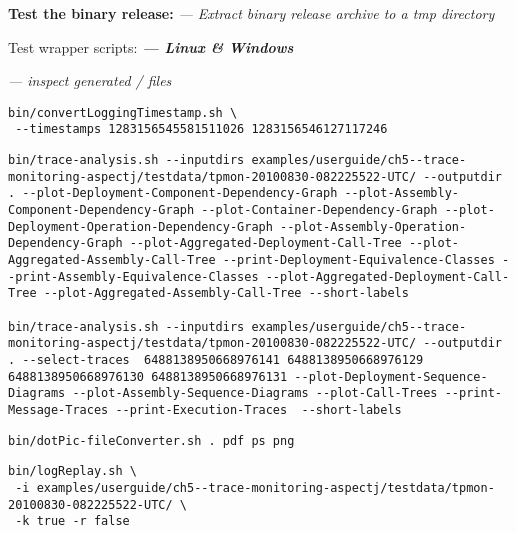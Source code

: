 \begin{compactenum}
\item \textbf{Test the binary release:} \textit{--- Extract binary release archive to a tmp directory}
\begin{compactenum}
\item Test wrapper scripts: \textbf{\textit{--- Linux \& Windows}}
\begin{compactitem}
\item {} \textit{--- inspect generated / files}
\setBashListing
\begin{lstlisting}
bin/convertLoggingTimestamp.sh \
 --timestamps 1283156545581511026 1283156546127117246
\end{lstlisting}
\item {}
\setBashListing
\begin{lstlisting}
bin/trace-analysis.sh --inputdirs examples/userguide/ch5--trace-monitoring-aspectj/testdata/tpmon-20100830-082225522-UTC/ --outputdir . --plot-Deployment-Component-Dependency-Graph --plot-Assembly-Component-Dependency-Graph --plot-Container-Dependency-Graph --plot-Deployment-Operation-Dependency-Graph --plot-Assembly-Operation-Dependency-Graph --plot-Aggregated-Deployment-Call-Tree --plot-Aggregated-Assembly-Call-Tree --print-Deployment-Equivalence-Classes --print-Assembly-Equivalence-Classes --plot-Aggregated-Deployment-Call-Tree --plot-Aggregated-Assembly-Call-Tree --short-labels

bin/trace-analysis.sh --inputdirs examples/userguide/ch5--trace-monitoring-aspectj/testdata/tpmon-20100830-082225522-UTC/ --outputdir . --select-traces  6488138950668976141 6488138950668976129 6488138950668976130 6488138950668976131 --plot-Deployment-Sequence-Diagrams --plot-Assembly-Sequence-Diagrams --plot-Call-Trees --print-Message-Traces --print-Execution-Traces  --short-labels
\end{lstlisting}

% 
\item {}
\setBashListing
\begin{lstlisting}
bin/dotPic-fileConverter.sh . pdf ps png
\end{lstlisting}
\item {}
\setBashListing
\begin{lstlisting}
bin/logReplay.sh \
 -i examples/userguide/ch5--trace-monitoring-aspectj/testdata/tpmon-20100830-082225522-UTC/ \
 -k true -r false


\end{lstlisting}
\end{compactitem}
\end{compactenum}
\end{compactenum}
